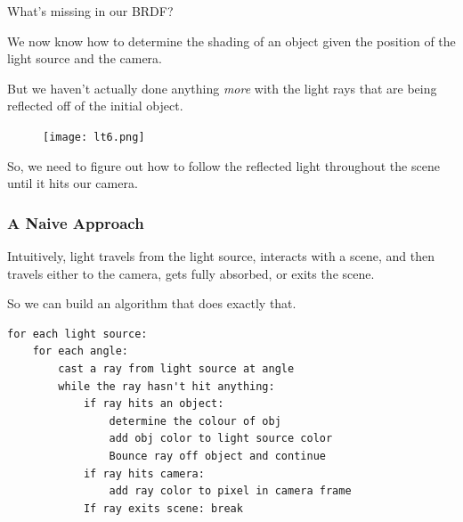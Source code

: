 \documentclass[12pt]{beamer}
\begin{document}

  \begin{frame}{What's missing in our BRDF?}

    We now know how to determine the shading of an object given the position of the light source and the camera.

    But we haven't actually done anything \textit{more} with the light rays that are being reflected off of the initial object.

    \begin{figure}
      \centering
      \texttt{[image: lt6.png]}
    \end{figure}

    So, we need to figure out how to follow the reflected light throughout the scene until it hits our camera.

  \end{frame}








  \begin{frame}
    \frametitle{A Naive Approach}

    Intuitively, light travels from the light source, interacts with a scene, and then travels either to the camera, gets fully absorbed, or exits the scene.

    So we can build an algorithm that does exactly that.

  \end{frame}

  \begin{frame}[fragile]

    \footnotesize            \begin{lstlisting}[label={lst:pseudocode-raytrace}]
for each light source:
    for each angle:
        cast a ray from light source at angle
        while the ray hasn't hit anything:
            if ray hits an object:
                determine the colour of obj
                add obj color to light source color
                Bounce ray off object and continue
            if ray hits camera:
                add ray color to pixel in camera frame
            If ray exits scene: break
    \end{lstlisting}

  \end{frame}
\end{document}
